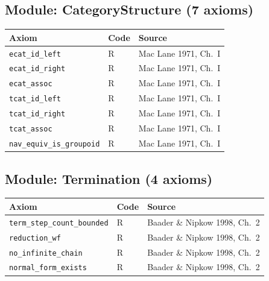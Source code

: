 \subsection*{Module: CategoryStructure (7 axioms)}

\begin{center}
\begin{tabular}{lll}
\toprule
Axiom & Code & Source \\
\midrule
\texttt{ecat\_id\_left} & R & Mac Lane 1971, Ch.~I \\
\texttt{ecat\_id\_right} & R & Mac Lane 1971, Ch.~I \\
\texttt{ecat\_assoc} & R & Mac Lane 1971, Ch.~I \\
\texttt{tcat\_id\_left} & R & Mac Lane 1971, Ch.~I \\
\texttt{tcat\_id\_right} & R & Mac Lane 1971, Ch.~I \\
\texttt{tcat\_assoc} & R & Mac Lane 1971, Ch.~I \\
\texttt{nav\_equiv\_is\_groupoid} & R & Mac Lane 1971, Ch.~I \\
\bottomrule
\end{tabular}
\end{center}

\subsection*{Module: Termination (4 axioms)}

\begin{center}
\begin{tabular}{lll}
\toprule
Axiom & Code & Source \\
\midrule
\texttt{term\_step\_count\_bounded} & R & Baader \& Nipkow 1998, Ch.~2 \\
\texttt{reduction\_wf} & R & Baader \& Nipkow 1998, Ch.~2 \\
\texttt{no\_infinite\_chain} & R & Baader \& Nipkow 1998, Ch.~2 \\
\texttt{normal\_form\_exists} & R & Baader \& Nipkow 1998, Ch.~2 \\
\bottomrule
\end{tabular}
\end{center}

